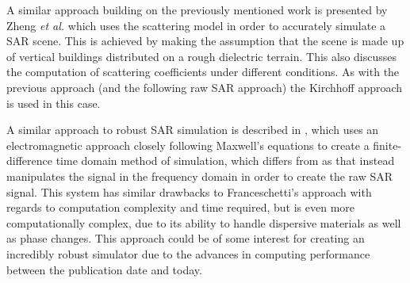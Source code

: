 A similar approach building on the previously mentioned work is presented by Zheng \textit{et al.} \cite{zhengSimulationMethodSAR2008} which uses the scattering model in order to accurately simulate a SAR scene. This is achieved by making the assumption that the scene is made up of vertical buildings distributed on a rough dielectric terrain. This also discusses the computation of scattering coefficients under different conditions. As with the previous approach (and the following raw SAR approach) the Kirchhoff approach is used in this case.
\par
A similar approach to robust SAR simulation is described in \cite{delliereSARMeasurementSimulation2007}, which uses an electromagnetic approach closely following Maxwell's equations to create a finite-difference time domain method of simulation, which differs from \cite{franceschettiSARRawSignal2003} as that instead manipulates the signal in the frequency domain in order to create the raw SAR signal. This system has similar drawbacks to Franceschetti's approach with regards to computation complexity and time required, but is even more computationally complex, due to its ability to handle dispersive materials as well as phase changes. This approach could be of some interest for creating an incredibly robust simulator due to the advances in computing performance between the publication date and today. \par
